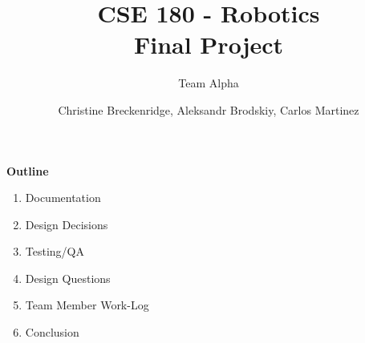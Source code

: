 \documentclass[12pt]{article}
\title{CSE 180 - Robotics \\ Final Project}
\subtitle{Team Alpha}
\author{Christine Breckenridge, Aleksandr Brodskiy, Carlos Martinez}
\begin{document}
\maketitle
{\setlength{\parindent}{0cm}
\textbf{Outline}
\begin{enumerate}  
\item Documentation
\item Design Decisions
\item Testing/QA
\item Design Questions
\item Team Member Work-Log
\item Conclusion\\\\\\\\\\\\\\\\\\\\\\\\\\\\
\end{enumerate} 
}
\end{document}
